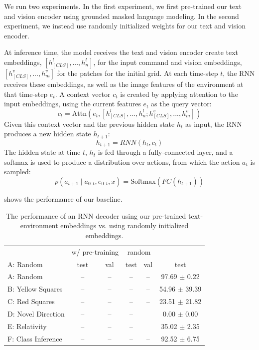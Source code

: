 \documentclass[11pt]{article}
\begin{document}
We run two experiments.
%
In the first experiment, we first pre-trained our text and vision encoder using grounded masked language modeling. 
%
In the second experiment, we instead use randomly initialized weights for our text and vision encoder.

%
At inference time, the model receives the text and vision encoder create text embeddings, $[h_{[CLS]}^{l},...,h_{n}^{l}]$, for the input command and vision embeddings, $[h_{[CLS]}^{v},...,h_{m}^{v}]$ for the patches for the initial grid.
%
At each time-step $t$, the RNN receives these embeddings, as well as the image features of the environment at that time-step $e_t$.
%
A context vector $c_t$ is created by applying attention to the input embeddings, using the current features $e_t$ as the query vector:
$$
c_t = \text{Attn}(e_t, [h_{[CLS]}^{l},...,h_{n}^{l}; h_{[CLS]}^{v},...,h_{m}^{v}] )
$$
Given this context vector and the previous hidden state $h_{t}$ as input, the RNN produces a new hidden state $h_{t+1}$:
$$
h_{t+1} = RNN(h_t, c_t)
$$
The hidden state at time $t$, $h_t$ is fed through a fully-connected layer, and a softmax is used to produce a distribution over actions, from which the action $a_t$ is sampled:
$$
p(a_{t+1} \mid a_{0:t}, e_{0:t}, x) = \text{Softmax}(FC(h_{t+1}))
$$
%

 shows the performance of our baseline.

\begin{table}
\begin{center}
\begin{tabularx}{\textwidth}{ l|ccccc }
\toprule
\multicolumn{1}{c}{} 
& \multicolumn{2}{c}{w/ pre-training}  
& \multicolumn{2}{c}{random}
& \multicolumn{1}{c}{\cite{ruis2020benchmark}}\\
A: Random & test  & val  & test &  val & test \\
\midrule
A: Random & --  & --  & -- &  -- & 97.69 $\pm$ 0.22\\
B: Yellow Squares & --  & --  & -- &  -- & 54.96 $\pm$ 39.39\\
C: Red Squares & --  & --  & -- &  -- & 23.51 $\pm$ 21.82\\
D: Novel Direction & --  & --  & -- &  & 0.00 $\pm$ 0.00 \\
E: Relativity & --  & --  & -- & & 35.02 $\pm$ 2.35 \\
F: Class Inference & --  & --  & -- &  -- & 92.52 $\pm$ 6.75 \\
\bottomrule
\end{tabularx}
\end{center}
\caption{The performance of an RNN decoder using our pre-trained text-environment embeddings vs. using randomly initialized embeddings.}
\label{tab:baseline_results}
\end{table}
\end{document}
